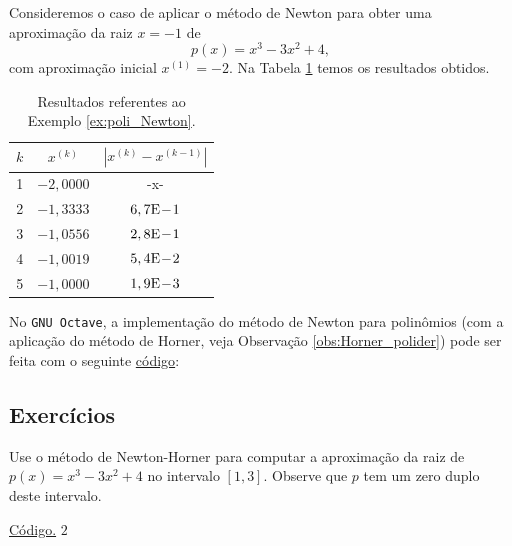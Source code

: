 \begin{ex}\label{ex:poli_Newton}
  Consideremos o caso de aplicar o método de Newton para obter uma aproximação da raiz $x=-1$ de
  \begin{equation}
    p(x) = x^3 - 3x^2 + 4,
  \end{equation}
  com aproximação inicial $x^{(1)} = -2$. Na Tabela \ref{tab:ex_poli_Newton} temos os resultados obtidos.

\begin{table}[h!]
  \centering
  \caption{Resultados referentes ao Exemplo \ref{ex:poli_Newton}.}
  \label{tab:ex_poli_Newton}
  \begin{tabular}{r|cc}
    $k$ & $x^{(k)}$ & $|x^{(k)}-x^{(k-1)}|$ \\\hline
    1 & $-2,0000$ & -x- \\
    2 & $-1,3333$ & $6,7\mathrm{E}\!-\!1$ \\
    3 & $-1,0556$ & $2,8\mathrm{E}\!-\!1$ \\
    4 & $-1,0019$ & $5,4\mathrm{E}\!-\!2$ \\
    5 & $-1,0000$ & $1,9\mathrm{E}\!-\!3$ \\\hline
  \end{tabular}
\end{table}


\ifisoctave
No \verb+GNU Octave+, a implementação do método de Newton para polinômios (com a aplicação do método de Horner, veja Observação \ref{obs:Horner_polider}) pode ser feita com o seguinte \href{https://github.com/phkonzen/notas/blob/master/src/MatematicaNumerica/cap_eq1d/dados/ex_poli_Newton/ex_poli_Newton.m}{código}:

\fi
\end{ex}

\subsection*{Exercícios}

\begin{exer}
  Use o método de Newton-Horner para computar a aproximação da raiz de $p(x) = x^3 - 3x^2 + 4$ no intervalo $[1,3]$. Observe que $p$ tem um zero duplo deste intervalo.
\end{exer}
\begin{resp}
  \ifisoctave 
  \href{https://github.com/phkonzen/notas/blob/master/src/MatematicaNumerica/cap_eq1d/dados/exer_NewtonHorner_multpar/exer_NewtonHorner_multpar.m}{Código.} 
  \fi
  $2$
\end{resp}